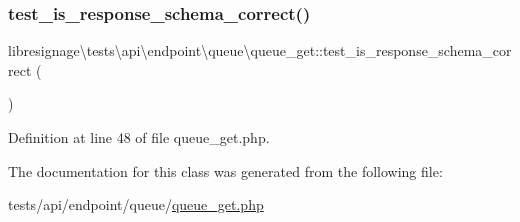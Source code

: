 \subsubsection{\texorpdfstring{test\+\_\+is\+\_\+response\+\_\+schema\+\_\+correct()}{test\_is\_response\_schema\_correct()}}
{\footnotesize\ttfamily libresignage\textbackslash{}tests\textbackslash{}api\textbackslash{}endpoint\textbackslash{}queue\textbackslash{}queue\+\_\+get\+::test\+\_\+is\+\_\+response\+\_\+schema\+\_\+correct (\begin{DoxyParamCaption}{ }\end{DoxyParamCaption})}



Definition at line 48 of file queue\+\_\+get.\+php.



The documentation for this class was generated from the following file\+:\begin{DoxyCompactItemize}
\item 
tests/api/endpoint/queue/\hyperlink{tests_2api_2endpoint_2queue_2queue__get_8php}{queue\+\_\+get.\+php}\end{DoxyCompactItemize}

